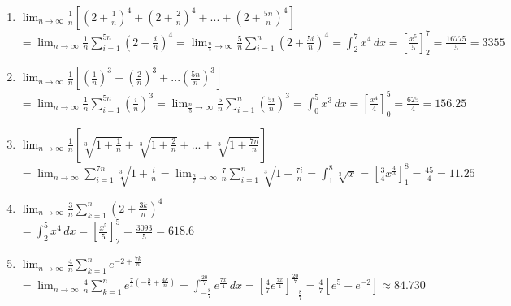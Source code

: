 \documentclass[10pt, letterpaper]{report}
\begin{document}
\begin{enumerate}
  \item{$\lim_{n\to\infty}\frac{1}{n}[(2+\frac{1}{n})^{4}+(2+\frac{2}{n})^{4}+...+(2+\frac{5n}{n})^{4}]$} \\

    $=\lim_{n\to\infty}\frac{1}{n}\sum_{i=1}^{5n}{(2+\frac{i}{n})^{4}}=
    \lim_{\frac{n}{5}\to\infty}\frac{5}{n}\sum_{i=1}^{n}(2+\frac{5i}{n})^{4}=
    \int_{2}^{7}{x^{4}}\,dx=
    [\frac{x^{5}}{5}]_{2}^{7}=
    \frac{16775}{5}=3355$ \\

  \item{$\lim_{n\to\infty}\frac{1}{n}[(\frac{1}{n})^{3}+(\frac{2}{n})^{3}+...(\frac{5n}{n})^{3}]$} \\

    $=\lim_{n\to\infty}\frac{1}{n}\sum_{i=1}^{5n}(\frac{i}{n})^{3}=
    \lim_{\frac{n}{5}\to\infty}\frac{5}{n}\sum_{i=1}^{n}(\frac{5i}{n})^{3}=
    \int_{0}^{5}{x^{3}}\,dx=
    [\frac{x^{4}}{4}]_{0}^{5}=\frac{625}{4}=156.25$ \\

  \item{$\lim_{n\to\infty}\frac{1}{n}[\sqrt[3]{1+\frac{1}{n}}+\sqrt[3]{1+\frac{2}{n}}+...+\sqrt[3]{1+\frac{7n}{n}}]$} \\

    $=\lim_{n\to\infty}\sum_{i=1}^{7n}\sqrt[3]{1+\frac{i}{n}}=
    \lim_{\frac{n}{7}\to\infty}\frac{7}{n}\sum_{i=1}^{n}\sqrt[3]{1+\frac{7i}{n}}=
    \int_{1}^{8}{\sqrt[3]{x}}=
    [\frac{3}{4}x^{\frac{4}{3}}]_{1}^{8}=\frac{45}{4}=11.25$ \\

  \item{$\lim_{n\to\infty}\frac{3}{n}\sum_{k=1}^{n}{(2+\frac{3k}{n})^{4}}$} \\

    $=\int_{2}^{5}{x^4}\,dx=
    [\frac{x^{5}}{5}]_{2}^{5}=
    \frac{3093}{5}=618.6$ \\

  \item{$\lim_{n\to\infty}\frac{4}{n}\sum_{k=1}^{n}{e^{-2+\frac{7k}{n}}}$} \\

    $=\lim_{n\to\infty}\frac{4}{n}\sum_{k=1}^{n}{e^{\frac{7}{4}(-\frac{8}{7}+\frac{4k}{n})}}=
    \int_{-\frac{8}{7}}^{\frac{20}{7}}{e^{\frac{7x}{4}}}\,dx=
    [\frac{4}{7}e^{\frac{7x}{4}}]_{-\frac{8}{7}}^{\frac{20}{7}}=
    \frac{4}{7}[e^{5}-e^{-2}]\approx84.730$ \\


\end{enumerate}
\end{document}
